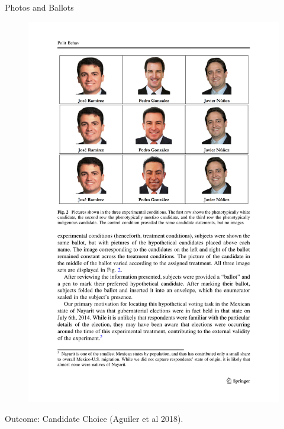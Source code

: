 \documentclass[
  ignorenonframetext,
]{beamer}
\begin{document}
\begin{frame}{Photos and Ballots}
\protect\hypertarget{photos-and-ballots-1}{}
\begin{figure}

{\centering \includegraphics[width=0.8\linewidth]{./figs/survey-exp-aguilar-18} 

}

\end{figure}

Outcome: Candidate Choice (Aguiler et al 2018).
\end{frame}
\end{document}
